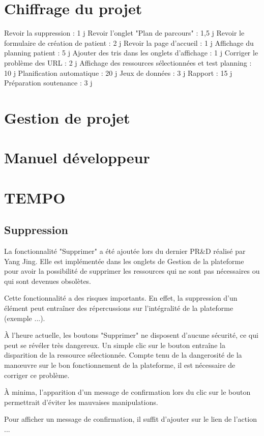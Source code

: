 \documentclass{polytech/polytech}
\begin{document}
\chapter{Chiffrage du projet}
\label{ann:chiffrage}

Revoir la suppression : 1 j
Revoir l'onglet "Plan de parcours" : 1,5 j
Revoir le formulaire de création de patient : 2 j
Revoir la page d'accueil : 1 j
Affichage du planning patient : 5 j
Ajouter des tris dans les onglets d'affichage : 1 j
Corriger le problème des URL : 2 j
Affichage des ressources sélectionnées et test planning : 10 j
Planification automatique : 20 j
Jeux de données : 3 j
Rapport : 15 j
Préparation soutenance : 3 j

\chapter{Gestion de projet}
\label{ann:gestion}

\chapter{Manuel développeur}


\chapter{TEMPO}

\section*{Suppression}

La fonctionnalité "Supprimer" a été ajoutée lors du dernier PR\&D réalisé par Yang Jing. Elle est implémentée dans les onglets de Gestion de la plateforme pour avoir la possibilité de supprimer les ressources qui ne sont pas nécessaires ou qui sont devenues obsolètes.  

Cette fonctionnalité a des risques importants. En effet, la suppression d'un élément peut entraîner des répercussions sur l'intégralité de la plateforme (exemple ...). 

À l'heure actuelle, les boutons "Supprimer" ne disposent d'aucune sécurité, ce qui peut se révéler très dangereux. Un simple clic sur le bouton entraîne la disparition de la ressource sélectionnée. Compte tenu de la dangerosité de la manœuvre sur le bon fonctionnement de la plateforme, il est nécessaire de corriger ce problème. 

À minima, l'apparition d'un message de confirmation lors du clic sur le bouton permettrait d'éviter les mauvaises manipulations. 

Pour afficher un message de confirmation, il suffit d'ajouter  sur le lien de l'action ...
\end{document}
